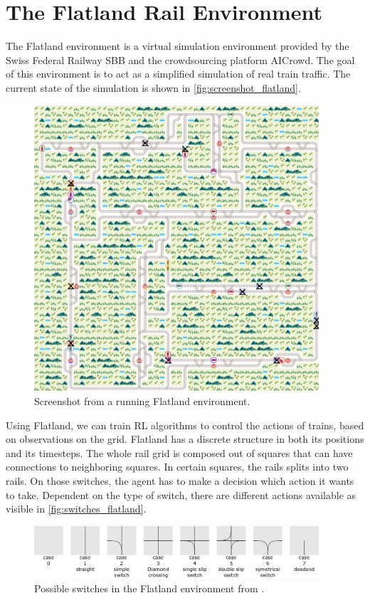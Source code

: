 \section{The Flatland Rail Environment}\label{flatland_intro}
The Flatland environment is a virtual simulation environment provided by the Swiss Federal Railway SBB and the crowdsourcing platform AICrowd.
The goal of this environment is to act as a simplified simulation of real train traffic. The current state of the simulation is shown in \autoref{fig:screenshot_flatland}.
\begin{figure}[H]
	\centering
	\includegraphics[width=300pt]{images/screenshot_flatland.png}
	\caption{Screenshot from a running Flatland environment.}
	\label{fig:screenshot_flatland}
\end{figure}
Using Flatland, we can train RL algorithms to control the actions of trains, based on observations on the grid. Flatland has a discrete structure in both its positions and its timesteps. The whole rail grid is composed out of squares that can have connections to neighboring squares. In certain squares, the rails splits into two rails. On those switches, the agent has to make a decision which action it wants to take. Dependent on the type of switch, there are different actions available as visible in \autoref{fig:switches_flatland}.
\begin{figure}[H]
	\centering
	\includegraphics[width=300pt]{images/transition_nips_proposal.png}
	\caption{Possible switches in the Flatland environment from \cite{flatland_docu}.}
	\label{fig:switches_flatland}
\end{figure}
